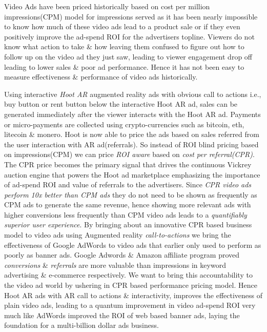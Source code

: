 Video Ads have been priced historically based on cost per million impressions(CPM) model for impressions served as it has been nearly impossible to know how much of these video ads lead to a product sale or if they even positively improve the ad-spend ROI for the advertisers topline. Viewers do not know what action to take \& how leaving them confused to figure out how to follow up on the video ad they just saw, leading to viewer engagement drop off leading to lower sales \& poor ad performance. Hence it has not been easy to measure effectiveness \& performance of video ads historically.

Using interactive \emph{Hoot AR} augmented reality ads with obvious call to actions i.e., buy button or rent button below the interactive Hoot AR ad, sales can be generated immediately after the viewer interacts with the Hoot AR ad. Payments or micro-payments are collected using crypto-currencies such as bitcoin, eth, litecoin \& monero. Hoot is now able to price the ads based on sales referred from the user interaction with AR ad(referrals). So instead of ROI blind pricing based on impressions(CPM) we can price \emph{ROI aware} based on \emph{cost per referral(CPR)}. The CPR price becomes the primary signal that drives the continuous Vickrey auction engine that powers the Hoot ad marketplace emphasizing the importance of ad-spend ROI and value of referrals to the advertisers. Since \emph{CPR video ads perform 10x better than CPM ads} they do not need to be shown as frequently as CPM ads to generate the same revenue, hence showing more relevant ads with higher conversions less frequently than CPM video ads leads to a \emph{quantifiably superior user experience}. By bringing about an innovative CPR based business model to video ads using Augmented reality \emph{call-to-actions} we bring the effectiveness of Google AdWords to video ads that earlier only used to perform as poorly as banner ads. Google Adwords \& Amazon affiliate program proved \emph{conversions} \& \emph{referrals} are more valuable than impressions in keyword advertising \& e-commerce respectively. We want to bring this accountability to the video ad world by ushering in CPR based performance pricing model. Hence Hoot AR ads with AR call to actions \& interactivity, improves the effectiveness of plain video ads, leading to a quantum improvement in video ad-spend ROI very much like AdWords improved the ROI of web based banner ads, laying the foundation for a multi-billion dollar ads business. 

